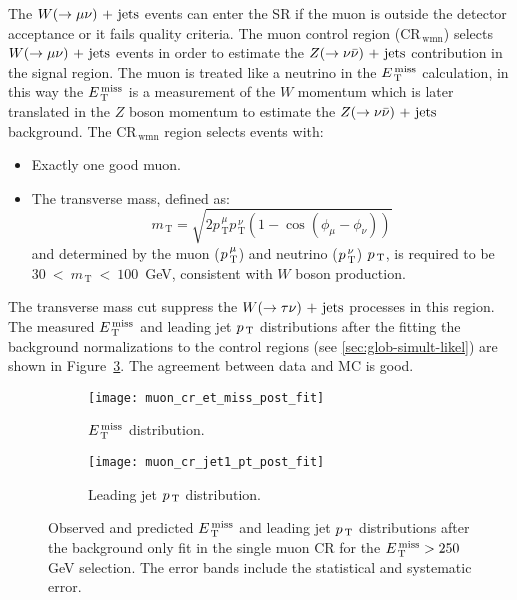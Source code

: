 The $W (\rightarrow \mu \nu)\mathrm{~+~jets}$ events can enter the SR if the muon is outside the detector
acceptance or it fails quality criteria. The muon control region
(CR$_\mathrm{\, wmn}$) selects $W (\rightarrow \mu \nu)\mathrm{~+~jets}$ events in order to estimate the
$Z (\rightarrow \nu \bar{\nu})\mathrm{~+~jets}$ contribution in the signal region. The muon is treated like a
neutrino in the $E_\mathrm{\, T}^\mathrm{\, miss}$ calculation, in this way the $E_\mathrm{\, T}^\mathrm{\, miss}$ is a measurement of
the $W$ momentum which is later translated in the $Z$ boson momentum to estimate
the $Z (\rightarrow \nu \bar{\nu})\mathrm{~+~jets}$ background. The CR$_{\mathrm{\, wmn}}$ region selects
events with:
\begin{itemize}
\item Exactly one good muon.
\item The transverse mass, defined as:
  \begin{equation}
    \label{eq:82}
    m_\mathrm{\, T} = \sqrt{2 p_\mathrm{\, T}^{\, \mu} p_\mathrm{\, T}^{\, \nu}
      (1 - \cos(\phi_\mu - \phi_\nu))}
  \end{equation}
  and determined by the muon ($p_\mathrm{\, T}^{\, \mu}$) and neutrino ($p_\mathrm{\, T}^{\, \nu}$)
  $p_\mathrm{\, T}$, is required to be $30~<~m_\mathrm{\, T}~<~100$~GeV, consistent with $W$
  boson production.
\end{itemize}
The transverse mass cut suppress the $W (\rightarrow \tau \nu)\mathrm{~+~jets}$ processes in this
region. The measured $E_\mathrm{\, T}^\mathrm{\, miss}$ and leading jet $p_\mathrm{\, T}$ distributions after the
fitting the background normalizations to the control regions (see
\cref{sec:glob-simult-likel}) are shown in Figure~\ref{fig:muon_cr_plots}. The
agreement between data and MC is good.

\begin{figure}[!h]
  \centering
  \begin{subfigure}[t]{.48\linewidth}
    \texttt{[image: muon\_cr\_et\_miss\_post\_fit]}
    \caption{$E_\mathrm{\, T}^\mathrm{\, miss}$ distribution.}
    \label{fig:muon_cr_et_miss_pre_fit}
  \end{subfigure}
  \begin{subfigure}[t]{.48\linewidth}
    \texttt{[image: muon\_cr\_jet1\_pt\_post\_fit]}
    \caption{Leading jet $p_\mathrm{\, T}$ distribution.}
    \label{fig:muon_cr_jet1_pt_pre_fit}
  \end{subfigure}
  \caption{Observed and predicted $E_\mathrm{\, T}^\mathrm{\, miss}$ and leading jet $p_\mathrm{\, T}$ distributions
    after the background only fit in the single muon CR for the $E_\mathrm{\, T}^\mathrm{\, miss} > 250~$GeV
    selection. The error bands include the statistical and systematic error.}
  \label{fig:muon_cr_plots}
\end{figure}
